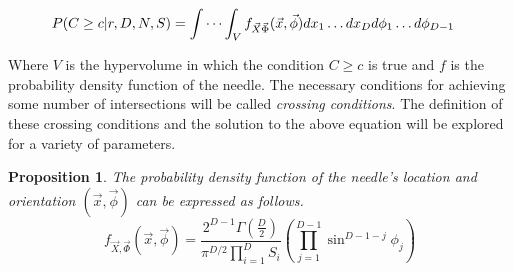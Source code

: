 \documentclass{article}
\newtheorem{proposition}{Proposition}
\begin{document}
\begin{align} 
	P(C\ge c|r, D, N, S)&=\idotsint_V f_{\vec{X}\vec\Phi}(\vec{x}, \vec{\phi})dx_1 \hdots dx_D d\phi_1 \hdots d\phi_{D-1} \label{eq:raw integral}
\end{align}

Where $V$ is the hypervolume in which the condition $C\ge c$ is true and $f$ is the probability
density function of the needle. The necessary conditions for achieving some number of intersections
will be called \emph{crossing conditions}. The definition of these crossing conditions and the solution to the above equation will be
explored for a variety of parameters.

\begin{proposition} \label{p:pdf}
The probability density function of the needle's location and orientation $(\vec{x}, \vec{\phi})$ can be 
expressed as follows.
\begin{equation}
	f_{\vec{X}, \vec{\Phi}}(\vec{x}, \vec{\phi}) = \frac{2^{D-1}\Gamma(\frac{D}{2})}{\pi^{D/2}\prod_{i=1}^{D}S_i}\left( \prod_{j=1}^{D-1}\sin^{D-1-j}\phi_j \right)
\end{equation}
\end{proposition}
\end{document}
